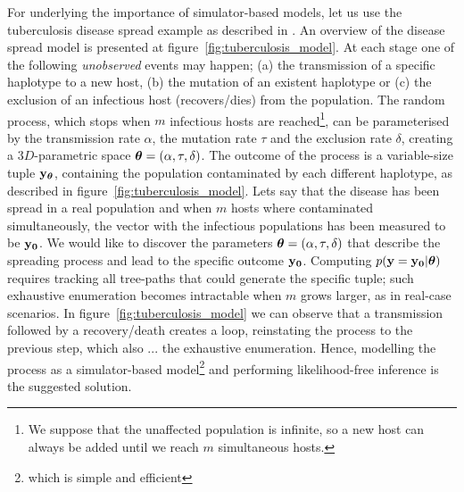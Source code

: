 For underlying the importance of simulator-based models, let us use
the tuberculosis disease spread example as described in
\autocite{Tanaka2006}. An overview of the disease spread model is
presented at figure~\ref{fig:tuberculosis_model}. At each stage one of
the following \textit{unobserved} events may happen; (a) the
transmission of a specific haplotype to a new host, (b) the mutation
of an existent haplotype or (c) the exclusion of an infectious host
(recovers/dies) from the population. The random process, which stops
when $m$ infectious hosts are reached\footnote{We suppose that the
  unaffected population is infinite, so a new host can always be added
  until we reach $m$ simultaneous hosts.}, can be parameterised by the
transmission rate $\alpha$, the mutation rate $\tau$ and the exclusion
rate $\delta$, creating a $3D$-parametric space
$\boldsymbol{\theta} = (\alpha, \tau, \delta)$. The outcome of the process is a
variable-size tuple $\mathbf{y}_{\boldsymbol{\theta}}$, containing the population
contaminated by each different haplotype, as described in
figure~\ref{fig:tuberculosis_model}. Lets say that the disease has
been spread in a real population and when $m$ hosts where contaminated
simultaneously, the vector with the infectious populations has been
measured to be $\mathbf{y_0}$. We would like to discover the parameters
$\boldsymbol{\theta} = (\alpha, \tau, \delta)$ that describe the spreading process
and lead to the specific outcome $\mathbf{y_0}$. Computing
$p(\mathbf{y}=\mathbf{y_0}|\boldsymbol{\theta})$ requires tracking all tree-paths that could
generate the specific tuple; such exhaustive enumeration becomes
intractable when $m$ grows larger, as in real-case scenarios. In
figure~\ref{fig:tuberculosis_model} we can observe that a transmission
followed by a recovery/death creates a loop, reinstating the process
to the previous step, which also ... the exhaustive
enumeration. Hence, modelling the process as a simulator-based
model\footnote{which is simple and efficient} and performing
likelihood-free inference is the suggested solution.


